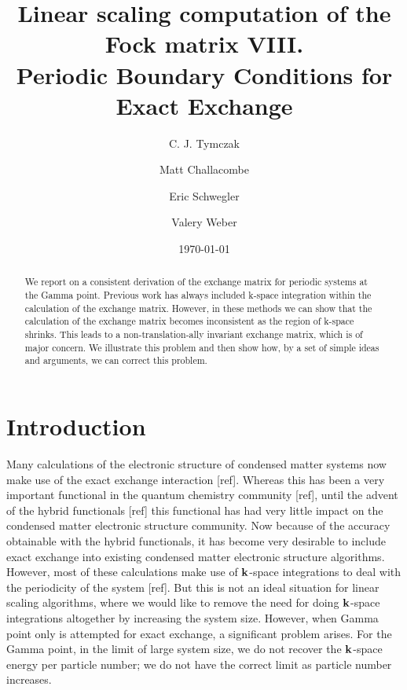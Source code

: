 \documentclass[prb,aps,nobibnotes,twocolumn,doublespace,twocolumngrid,superbib]{revtex4}
\begin{document}
\title{Linear scaling computation of the Fock matrix VIII. \\
       Periodic Boundary Conditions for Exact Exchange}

\author{C. J. Tymczak}
\author{Matt Challacombe}
\author{Eric Schwegler}
\author{Valery Weber}


\date{\today}

\begin{abstract}
We report on a consistent derivation of the exchange matrix for periodic
systems at the Gamma point. Previous work has always included k-space integration 
within the calculation of the exchange matrix. However, in  these methods
we can show that the calculation of the exchange matrix becomes inconsistent as the
region of k-space shrinks. This leads to a non-translation-ally invariant exchange matrix,
which is of major concern. We illustrate this problem and then show how, by a set of
simple ideas and arguments, we can correct this problem.
\end{abstract}

\maketitle

\section{Introduction}
Many calculations of the electronic structure of condensed matter systems now make use
of the exact exchange interaction [ref]. Whereas this has been a very
important functional in the quantum chemistry community [ref], until the
advent of the hybrid functionals [ref] this functional has had very little impact on the
condensed matter electronic structure community. Now because of the accuracy obtainable with
the hybrid functionals, it has become very desirable to include exact exchange into
existing condensed matter electronic structure algorithms. 
However, most of these calculations make use of ${\bf k}$-space integrations to 
deal with the periodicity of the system [ref]. But this is not an ideal situation 
for linear scaling algorithms, where we would like to remove the need for doing
${\bf k}$-space integrations altogether by increasing the system size. 
However, when Gamma point only is attempted for exact exchange, a 
significant problem arises. For the Gamma point, in the limit of large system size,
we do not recover the ${\bf k}$-space energy per particle number; we do not have the correct
limit as particle number increases.  
%
\end{document}
